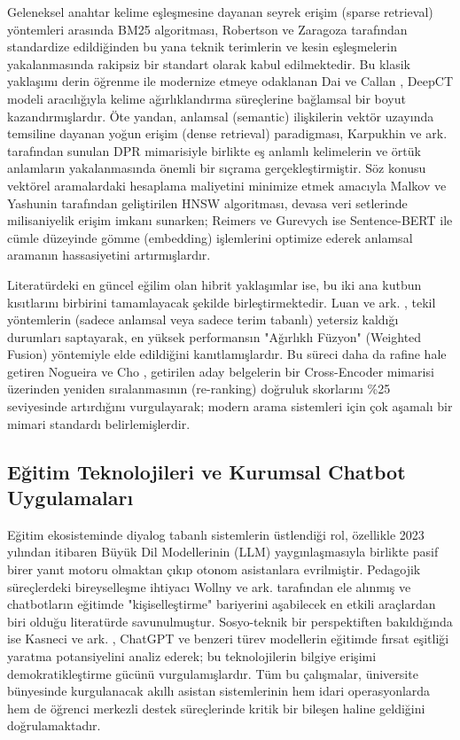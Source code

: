 \documentclass[12pt,a4paper]{report}
\begin{document}
Geleneksel anahtar kelime eşleşmesine dayanan seyrek erişim (sparse retrieval) yöntemleri arasında BM25 algoritması, Robertson ve Zaragoza \cite{robertson2009probabilistic} tarafından standardize edildiğinden bu yana teknik terimlerin ve kesin eşleşmelerin yakalanmasında rakipsiz bir standart olarak kabul edilmektedir. Bu klasik yaklaşımı derin öğrenme ile modernize etmeye odaklanan Dai ve Callan \cite{dai2019deepct}, DeepCT modeli aracılığıyla kelime ağırlıklandırma süreçlerine bağlamsal bir boyut kazandırmışlardır. Öte yandan, anlamsal (semantic) ilişkilerin vektör uzayında temsiline dayanan yoğun erişim (dense retrieval) paradigması, Karpukhin ve ark. \cite{karpukhin2020dense} tarafından sunulan DPR mimarisiyle birlikte eş anlamlı kelimelerin ve örtük anlamların yakalanmasında önemli bir sıçrama gerçekleştirmiştir. Söz konusu vektörel aramalardaki hesaplama maliyetini minimize etmek amacıyla Malkov ve Yashunin \cite{malkov2018efficient} tarafından geliştirilen HNSW algoritması, devasa veri setlerinde milisaniyelik erişim imkanı sunarken; Reimers ve Gurevych \cite{reimers2019sentence} ise Sentence-BERT ile cümle düzeyinde gömme (embedding) işlemlerini optimize ederek anlamsal aramanın hassasiyetini artırmışlardır.

Literatürdeki en güncel eğilim olan hibrit yaklaşımlar ise, bu iki ana kutbun kısıtlarını birbirini tamamlayacak şekilde birleştirmektedir. Luan ve ark. \cite{luan2021sparse}, tekil yöntemlerin (sadece anlamsal veya sadece terim tabanlı) yetersiz kaldığı durumları saptayarak, en yüksek performansın "Ağırlıklı Füzyon" (Weighted Fusion) yöntemiyle elde edildiğini kanıtlamışlardır. Bu süreci daha da rafine hale getiren Nogueira ve Cho \cite{nogueira2019passage}, getirilen aday belgelerin bir Cross-Encoder mimarisi üzerinden yeniden sıralanmasının (re-ranking) doğruluk skorlarını \%25 seviyesinde artırdığını vurgulayarak; modern arama sistemleri için çok aşamalı bir mimari standardı belirlemişlerdir.

\subsection{Eğitim Teknolojileri ve Kurumsal Chatbot Uygulamaları}
Eğitim ekosisteminde diyalog tabanlı sistemlerin üstlendiği rol, özellikle 2023 yılından itibaren Büyük Dil Modellerinin (LLM) yaygınlaşmasıyla birlikte pasif birer yanıt motoru olmaktan çıkıp otonom asistanlara evrilmiştir. Pedagojik süreçlerdeki bireyselleşme ihtiyacı Wollny ve ark. \cite{wollny2021systematic} tarafından ele alınmış ve chatbotların eğitimde "kişiselleştirme" bariyerini aşabilecek en etkili araçlardan biri olduğu literatürde savunulmuştur. Sosyo-teknik bir perspektiften bakıldığında ise Kasneci ve ark. \cite{kasneci2023chatgpt}, ChatGPT ve benzeri türev modellerin eğitimde fırsat eşitliği yaratma potansiyelini analiz ederek; bu teknolojilerin bilgiye erişimi demokratikleştirme gücünü vurgulamışlardır. Tüm bu çalışmalar, üniversite bünyesinde kurgulanacak akıllı asistan sistemlerinin hem idari operasyonlarda hem de öğrenci merkezli destek süreçlerinde kritik bir bileşen haline geldiğini doğrulamaktadır.
\end{document}
